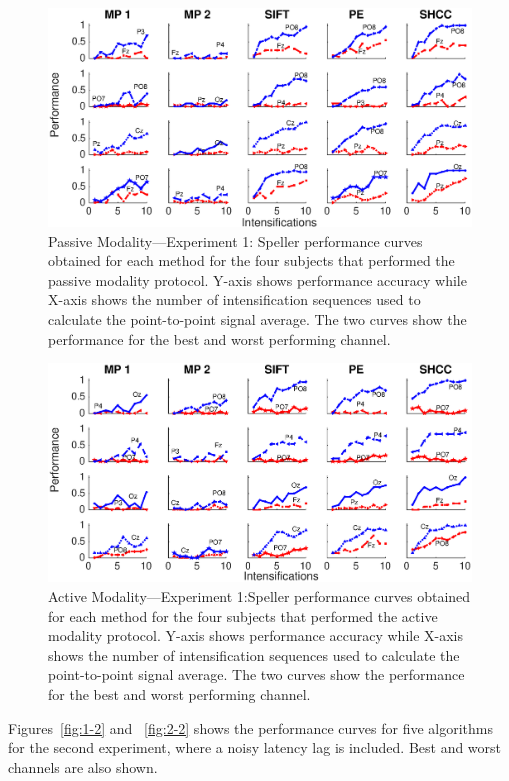 \documentclass[brainsci,article,accept,moreauthors,pdftex,10pt,a4paper]{mdpi}
\begin{document}
\begin{figure}[H]
\centering
\includegraphics[width=15cm]{images/1-1.eps}
\caption{{Passive Modality---Experiment 1}: Speller performance curves obtained for each method for the four subjects that performed the passive modality protocol.  Y-axis shows performance accuracy while X-axis shows the number of intensification sequences used to calculate the point-to-point signal average. The two curves show the performance for the best and worst performing channel. }
\label{fig:1-1}
\end{figure}

\begin{figure}[H]
\centering
\includegraphics[width=16.5cm]{images/2-1.eps}
\caption{{Active Modality---Experiment 1}:Speller performance curves obtained for each method for the four subjects that performed the active modality protocol.  Y-axis shows performance accuracy while X-axis shows the number of intensification sequences used to calculate the point-to-point signal average. The two curves show the performance for the best and worst performing channel. }
\label{fig:2-1}
\end{figure}


Figures~\ref{fig:1-2} and ~\ref{fig:2-2}  shows the performance curves for five algorithms for the second experiment, where a noisy latency lag is included. Best and worst channels are also shown.  
\end{document}
